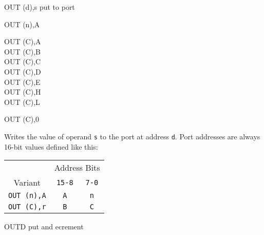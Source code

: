 \begin{basedescript}{
	\desclabelstyle{\multilinelabel}
	\desclabelwidth{3cm}}
	\pagebreak
	\begin{DetailItem}{OUT (d),s}
		{put to port}
		{}

		\begin{DetailVariants}
			OUT (n),A
			
			\columnbreak
			OUT (C),A\\
			OUT (C),B\\
			OUT (C),C\\
			OUT (C),D\\
			OUT (C),E\\
			OUT (C),H\\
			OUT (C),L

			\columnbreak
			OUT (C),0\UNDOC
		\end{DetailVariants}

		Writes the value of operand {\tt s} to the port at address {\tt d}. Port addresses are always 16-bit values defined like this:

		\begin{tabular}{ccc}
			& \multicolumn{2}{c}{Address Bits} \\
			Variant & {\tt 15-8} & {\tt 7-0} \\
			\hline
			{\tt OUT (n),A} & {\tt A} & {\tt n} \\
			{\tt OUT (C),r} & {\tt B} & {\tt C} \\
		\end{tabular}
		\vspace{1ex} %

		\begin{DetailEffects}
			\FlagsOUTcr
		\end{DetailEffects}
		
		\begin{DetailTiming}
		\end{DetailTiming}


	\end{DetailItem}

	\label{DetailRefOUTD}
	\begin{DetailItem}{OUTD}
		{put and ecrement}
		{\SymOUTD}


\end{DetailItem}
\end{basedescript}
